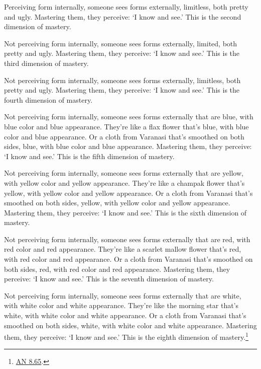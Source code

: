 \documentclass[12pt,openany]{book}%
\begin{document}
Perceiving form internally, someone sees forms externally, limitless, both pretty and ugly. Mastering them, they perceive: ‘I know and see.’ This is the second dimension of mastery. 

Not perceiving form internally, someone sees forms externally, limited, both pretty and ugly. Mastering them, they perceive: ‘I know and see.’ This is the third dimension of mastery. 

Not perceiving form internally, someone sees forms externally, limitless, both pretty and ugly. Mastering them, they perceive: ‘I know and see.’ This is the fourth dimension of mastery. 

Not perceiving form internally, someone sees forms externally that are blue, with blue color and blue appearance. They’re like a flax flower that’s blue, with blue color and blue appearance. Or a cloth from Varanasi that’s smoothed on both sides, blue, with blue color and blue appearance. Mastering them, they perceive: ‘I know and see.’ This is the fifth dimension of mastery. 

Not perceiving form internally, someone sees forms externally that are yellow, with yellow color and yellow appearance. They’re like a champak flower that’s yellow, with yellow color and yellow appearance. Or a cloth from Varanasi that’s smoothed on both sides, yellow, with yellow color and yellow appearance. Mastering them, they perceive: ‘I know and see.’ This is the sixth dimension of mastery. 

Not perceiving form internally, someone sees forms externally that are red, with red color and red appearance. They’re like a scarlet mallow flower that’s red, with red color and red appearance. Or a cloth from Varanasi that’s smoothed on both sides, red, with red color and red appearance. Mastering them, they perceive: ‘I know and see.’ This is the seventh dimension of mastery. 

Not perceiving form internally, someone sees forms externally that are white, with white color and white appearance. They’re like the morning star that’s white, with white color and white appearance. Or a cloth from Varanasi that’s smoothed on both sides, white, with white color and white appearance. Mastering them, they perceive: ‘I know and see.’ This is the eighth dimension of mastery.\footnote{\href{https://suttacentral.net/an8.65/en/sujato}{AN 8.65}. } 
\end{document}
